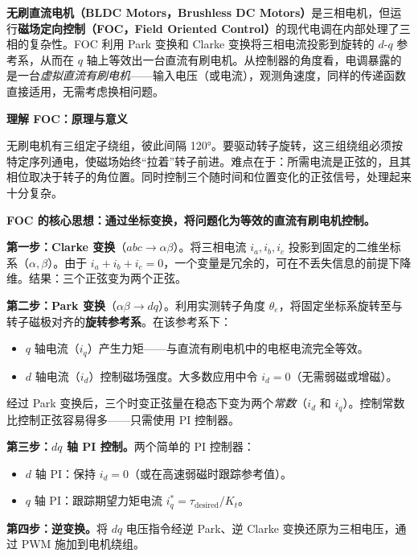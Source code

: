 \textbf{无刷直流电机（BLDC Motors，Brushless DC Motors）}是三相电机，但运行\textbf{磁场定向控制（FOC，Field Oriented Control）}的现代电调在内部处理了三相的复杂性。FOC 利用 Park 变换和 Clarke 变换将三相电流投影到旋转的 $d$-$q$ 参考系，从而在 $q$ 轴上等效出一台直流有刷电机。从控制器的角度看，电调暴露的是一台\emph{虚拟直流有刷电机}——输入电压（或电流），观测角速度，同样的传递函数直接适用，无需考虑换相问题。

\vspace{0.5em}
\begin{mdframed}[linewidth=1pt, innertopmargin=10pt, innerbottommargin=10pt]
\textbf{理解 FOC：原理与意义}

\vspace{0.3em}
无刷电机有三组定子绕组，彼此间隔 120°。要驱动转子旋转，这三组绕组必须按特定序列通电，使磁场始终``拉着''转子前进。难点在于：所需电流是正弦的，且其相位取决于转子的角位置。同时控制三个随时间和位置变化的正弦信号，处理起来十分复杂。

\textbf{FOC 的核心思想：通过坐标变换，将问题化为等效的直流有刷电机控制。}

\textbf{第一步：Clarke 变换}（$abc \to \alpha\beta$）。将三相电流 $i_a, i_b, i_c$ 投影到固定的二维坐标系（$\alpha, \beta$）。由于 $i_a + i_b + i_c = 0$，一个变量是冗余的，可在不丢失信息的前提下降维。结果：三个正弦变为两个正弦。

\textbf{第二步：Park 变换}（$\alpha\beta \to dq$）。利用实测转子角度 $\theta_e$，将固定坐标系旋转至与转子磁极对齐的\textbf{旋转参考系}。在该参考系下：
\begin{itemize}[nosep]
    \item $q$ 轴电流（$i_q$）产生力矩——与直流有刷电机中的电枢电流完全等效。
    \item $d$ 轴电流（$i_d$）控制磁场强度。大多数应用中令 $i_d = 0$（无需弱磁或增磁）。
\end{itemize}

经过 Park 变换后，三个时变正弦量在稳态下变为两个\textit{常数}（$i_d$ 和 $i_q$）。控制常数比控制正弦容易得多——只需使用 PI 控制器。

\textbf{第三步：$dq$ 轴 PI 控制。}两个简单的 PI 控制器：
\begin{itemize}[nosep]
    \item $d$ 轴 PI：保持 $i_d = 0$（或在高速弱磁时跟踪参考值）。
    \item $q$ 轴 PI：跟踪期望力矩电流 $i_q^* = \tau_{\text{desired}} / K_t$。
\end{itemize}

\textbf{第四步：逆变换。}将 $dq$ 电压指令经逆 Park、逆 Clarke 变换还原为三相电压，通过 PWM 施加到电机绕组。


\end{mdframed}
